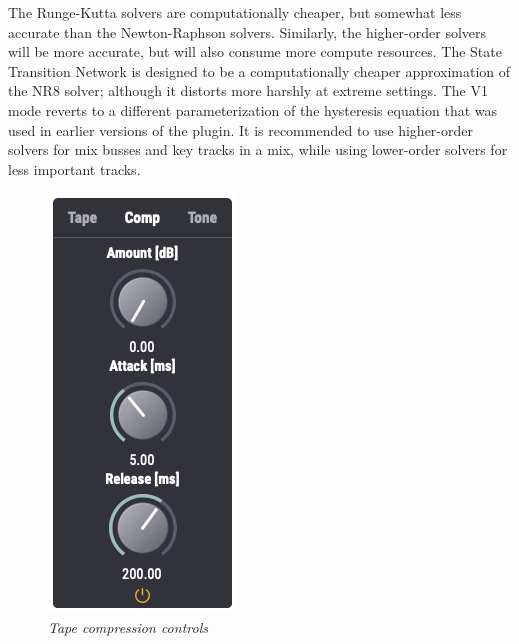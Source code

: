 \documentclass[landscape,twocolumn,a5paper]{manual}
\begin{document}
%
The Runge-Kutta solvers are computationally cheaper, but
somewhat less accurate than the Newton-Raphson solvers.
Similarly, the higher-order solvers will be more accurate,
but will also consume more compute resources. The State
Transition Network is designed to be a computationally
cheaper approximation of the NR8 solver; although it
distorts more harshly at extreme settings. The V1 mode
reverts to a different parameterization of the hysteresis
equation that was used in earlier versions of the plugin. It
is recommended to use higher-order solvers for mix busses
and key tracks in a mix, while using lower-order solvers for
less important tracks.

\begin{figure}[ht]
    \center
    \includegraphics[height=0.32\paperheight]{../Plugin/Screenshots/Comp.png}
    \caption{\label{comp_controls}{\it Tape compression controls}}
\end{figure}
%
\end{document}
